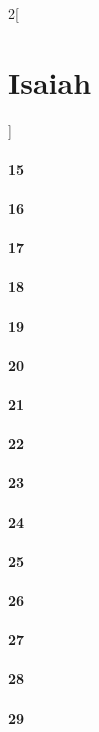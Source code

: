 \documentclass{book}
\begin{document}
\begin{multicols}{2}[\part{Isaiah}]
\subsection*{15}
\subsection*{16}
\subsection*{17}
\subsection*{18}
\subsection*{19}
\subsection*{20}
\subsection*{21}
\subsection*{22}
\subsection*{23}
\subsection*{24}
\subsection*{25}
\subsection*{26}
\subsection*{27}
\subsection*{28}
\subsection*{29}

\end{multicols}
\end{document}
